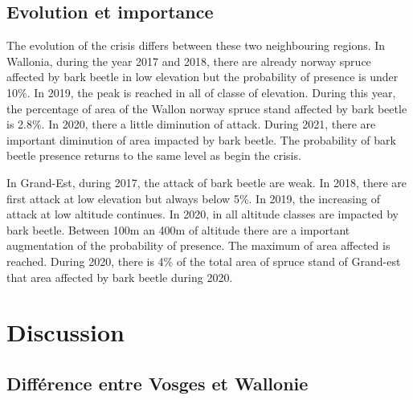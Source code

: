 \documentclass[3p,procedia]{elsarticle}
\begin{document}
	



\subsection{Evolution et importance}

The evolution of the crisis differs between these two neighbouring regions. 
In Wallonia, during the year 2017 and 2018, there are already norway spruce affected by bark beetle in low elevation but the probability of presence is under 10\%. 
In 2019, the peak is reached in all of classe of elevation. During this year, the percentage of area of the Wallon norway spruce stand affected by bark beetle is 2.8\%.
In 2020, there a  little diminution of attack. 
During 2021, there are important diminution of area impacted by bark beetle. The probability of bark beetle presence returns to the same level as begin the crisis.

In Grand-Est, during 2017, the attack of bark beetle are weak. 
In 2018, there are first attack at low elevation but always below 5\%.
In 2019, the increasing of attack at low altitude continues.
In 2020, in all altitude classes are impacted by bark beetle. 
Between 100m an 400m of altitude there are a important augmentation of the probability of presence. 
The maximum of area affected is reached. %
During 2020, there is 4\% of the total area of spruce stand of Grand-est that area affected by bark beetle during 2020.

 
  




\section{Discussion}

\subsection{Différence entre Vosges et Wallonie}
\end{document}
